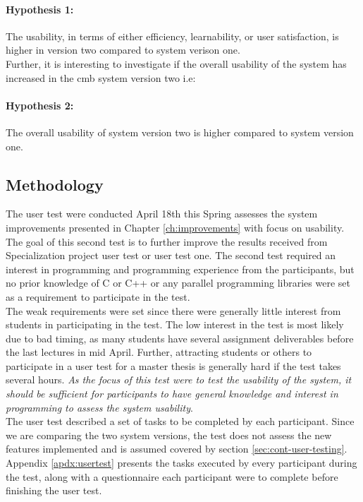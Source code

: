 \paragraph*{Hypothesis 1:} The usability, in terms of either efficiency, learnability, or user satisfaction, is higher in version two compared to system verison one. \hfill \\

Further, it is interesting to investigate if the overall usability of the system has increased in the \gls{cmb} system version two i.e:

\paragraph*{Hypothesis 2:} The overall usability of system version two is higher compared to system version one. \hfill \\

\subsection{Methodology}
The user test were conducted April 18th this Spring assesses the system improvements presented in Chapter \ref{ch:improvements} with focus on usability. The goal of this second test is to further improve the results received from Specialization project user test or user test one. The second test required an interest in programming and programming experience from the participants, but no prior knowledge of C or C++ or any parallel programming libraries were set as a requirement to participate in the test. \\

The weak requirements were set since there were generally little interest from students in participating in the test. The low interest in the test is most likely due to bad timing, as many students have several assignment deliverables before the last lectures in mid April. Further, attracting students or others to participate in a user test for a master thesis is generally hard if the test takes several hours. \textit{As the focus of this test were to test the usability of the system, it should be sufficient for participants to have general knowledge and interest in programming to assess the system usability}. \\

The user test described a set of tasks to be completed by each participant. Since we are comparing the two system versions, the test does not assess the new features implemented and is assumed covered by section \ref{sec:cont-user-testing}. Appendix \ref{apdx:usertest} presents the tasks executed by every participant during the test, along with a questionnaire each participant were to complete before finishing the user test. \\

